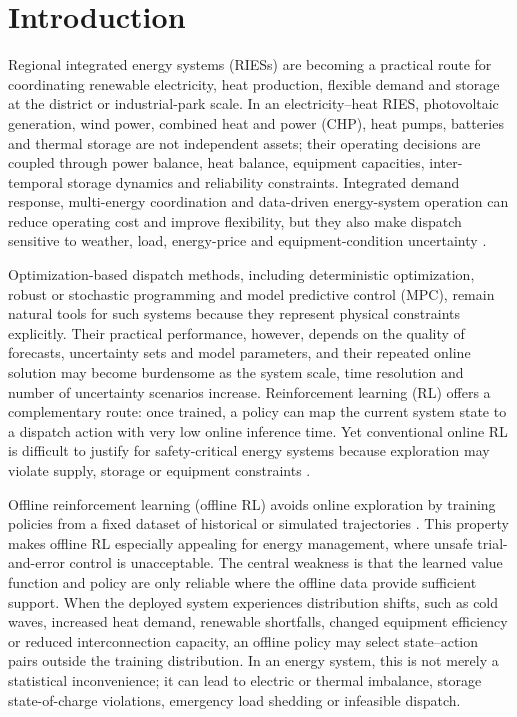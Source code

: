 \documentclass[preprint,12pt]{elsarticle}
\begin{document}
\section{Introduction}

Regional integrated energy systems (RIESs) are becoming a practical route for coordinating renewable electricity, heat production, flexible demand and storage at the district or industrial-park scale. In an electricity--heat RIES, photovoltaic generation, wind power, combined heat and power (CHP), heat pumps, batteries and thermal storage are not independent assets; their operating decisions are coupled through power balance, heat balance, equipment capacities, inter-temporal storage dynamics and reliability constraints. Integrated demand response, multi-energy coordination and data-driven energy-system operation can reduce operating cost and improve flexibility, but they also make dispatch sensitive to weather, load, energy-price and equipment-condition uncertainty \cite{Wang2017IntegratedDemandResponse,Ramprasad2022MLSustainableEnergy}.

Optimization-based dispatch methods, including deterministic optimization, robust or stochastic programming and model predictive control (MPC), remain natural tools for such systems because they represent physical constraints explicitly. Their practical performance, however, depends on the quality of forecasts, uncertainty sets and model parameters, and their repeated online solution may become burdensome as the system scale, time resolution and number of uncertainty scenarios increase. Reinforcement learning (RL) offers a complementary route: once trained, a policy can map the current system state to a dispatch action with very low online inference time. Yet conventional online RL is difficult to justify for safety-critical energy systems because exploration may violate supply, storage or equipment constraints \cite{Sutton1998RL,DulacArnold2021RealWorldRLChallenges}.

Offline reinforcement learning (offline RL) avoids online exploration by training policies from a fixed dataset of historical or simulated trajectories \cite{Levine2020OfflineRL,Prudencio2024OfflineRLSurvey}. This property makes offline RL especially appealing for energy management, where unsafe trial-and-error control is unacceptable. The central weakness is that the learned value function and policy are only reliable where the offline data provide sufficient support. When the deployed system experiences distribution shifts, such as cold waves, increased heat demand, renewable shortfalls, changed equipment efficiency or reduced interconnection capacity, an offline policy may select state--action pairs outside the training distribution. In an energy system, this is not merely a statistical inconvenience; it can lead to electric or thermal imbalance, storage state-of-charge violations, emergency load shedding or infeasible dispatch.
\end{document}

